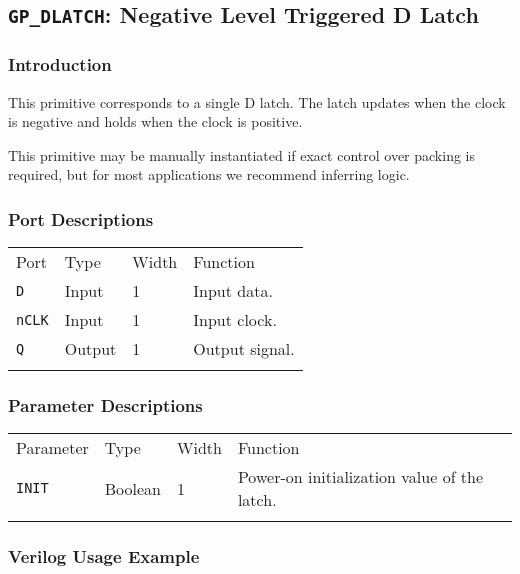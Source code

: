 \documentclass[11pt]{article}
\newcommand{\tokenstyle}[1]{\texttt{#1}}
\newcommand{\whenstyle}[1]{{\fontseries{sb}\selectfont#1}}
\newcommand{\thinhline}{\Xhline{1\arrayrulewidth}}
\newcommand{\thickhline}{\Xhline{2.5\arrayrulewidth}}
\begin{document}

\pagebreak
\subsection{\tokenstyle{GP\_DLATCH}: Negative Level Triggered D Latch}
\label{gp-latch}

\subsubsection{Introduction}
This primitive corresponds to a single D latch. The latch updates when the clock is negative and holds 
when the clock is positive.

This primitive may be manually instantiated if exact control over packing is required, but for most applications we
recommend inferring logic.

\subsubsection{Port Descriptions}

\begin{tabularx}{\textwidth}{lllX}
\thinhline
\whenstyle{Port} & \whenstyle{Type} & \whenstyle{Width} & \whenstyle{Function} \\
\thickhline
\tokenstyle{D} & Input & 1 & Input data. \\
\thinhline
\tokenstyle{nCLK} & Input & 1 & Input clock. \\
\thinhline
\tokenstyle{Q} & Output & 1 & Output signal. \\
\thinhline
\end{tabularx}

\subsubsection{Parameter Descriptions}

\begin{tabularx}{\textwidth}{lllX}
\thinhline
\whenstyle{Parameter} & \whenstyle{Type} & \whenstyle{Width} & \whenstyle{Function} \\
\thickhline
\tokenstyle{INIT} & Boolean & 1 & Power-on initialization value of the latch.\\
\thinhline
\end{tabularx}

\subsubsection{Verilog Usage Example}
\end{document}
